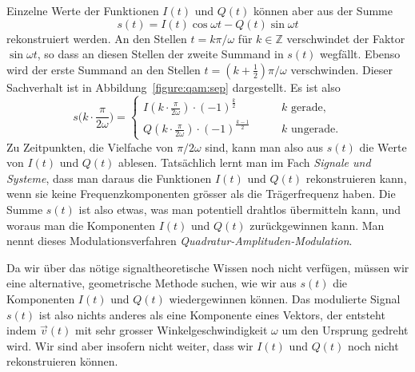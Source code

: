 Einzelne Werte der Funktionen $I(t)$ und $Q(t)$ können aber aus der Summe
\[
s(t)
=
I(t)\cos\omega t - Q(t)\sin\omega t
\]
rekonstruiert werden.
An den Stellen $t = k\pi/\omega$ für $k\in\mathbb Z$ verschwindet
der Faktor $\sin\omega t$,
so dass an diesen Stellen der zweite Summand in $s(t)$ wegfällt.
Ebenso wird der erste Summand an den Stellen
$t = (k+\frac12)\pi/\omega$ verschwinden.
Dieser Sachverhalt ist in Abbildung~\ref{figure:qam:sep} dargestellt.
Es ist also
\[
s\biggl(k\cdot \frac{\pi}{2\omega}\biggr)
=
\begin{cases}
I(k\cdot \frac{\pi}{2\omega})\cdot(-1)^{\frac{k}2}
&\qquad \text{$k$ gerade,}\\[5pt]
Q(k\cdot \frac{\pi}{2\omega})\cdot(-1)^{\frac{k-1}2}
&\qquad \text{$k$ ungerade.}
\end{cases}
\]
Zu Zeitpunkten, die Vielfache von $\pi/2\omega$ sind, kann man also aus
$s(t)$ die Werte von $I(t)$ und $Q(t)$ ablesen.
Tatsächlich lernt man im Fach {\em Signale und Systeme}, dass man daraus
die Funktionen $I(t)$ und $Q(t)$ rekonstruieren kann, wenn sie keine
Frequenzkomponenten grösser als die Trägerfrequenz haben.
Die Summe $s(t)$ ist also etwas, was man potentiell drahtlos übermitteln
kann, und woraus man die Komponenten $I(t)$ und $Q(t)$ zurückgewinnen kann.
Man nennt dieses Modulationsverfahren {\em Quadratur-Amplituden-Modulation}.

Da wir über das nötige signaltheoretische Wissen noch nicht verfügen,
müssen wir eine alternative, geometrische Methode suchen, wie wir
aus $s(t)$ die Komponenten $I(t)$ und $Q(t)$ wiedergewinnen können.
Das modulierte Signal $s(t)$ ist also nichts anderes als eine
Komponente eines Vektors, der entsteht indem $\vec{v}(t)$ mit sehr grosser
Winkelgeschwindigkeit $\omega$ um den Ursprung gedreht wird.
Wir sind aber insofern nicht weiter, dass wir $I(t)$ und $Q(t)$ noch nicht
rekonstruieren können.



